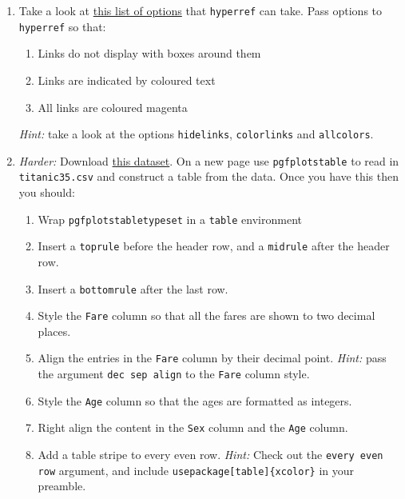 \documentclass{article}
\begin{document}
\begin{enumerate}[label=\color{purple}\theenumi.]
  \item Take a look at
    \href{http://mirror.ox.ac.uk/sites/ctan.org/macros/latex/contrib/hyperref/doc/manual.pdf#page=10}
        {this list of options} that \texttt{hyperref} can take. Pass options to 
    \texttt{hyperref} so that:
    \begin{enumerate}[label=\color{purple}\roman*)]
      \item Links do not display with boxes around them
      \item Links are indicated by coloured text
      \item All links are coloured magenta
    \end{enumerate}
    \textsl{Hint:} take a look at the options \texttt{hidelinks},
    \texttt{colorlinks} and \texttt{allcolors}.

  \item \emph{Harder:} Download
    \href{https://jwalton.info/assets/teaching/latex/titanic35.csv}%
    {this dataset}. On a new page use \texttt{pgfplotstable} to read in 
    \texttt{titanic35.csv} and construct a table from the data. Once you have
    this then you should:
    \begin{enumerate}[label=\color{purple}\roman*)]
      \item Wrap \texttt{pgfplotstabletypeset} in a \texttt{table} environment
      \item Insert a \texttt{toprule} before the header row, and a
        \texttt{midrule} after the header row.
      \item Insert a \texttt{bottomrule} after the last row.
      \item Style the \texttt{Fare} column so that all the fares are shown to
        two decimal places.
      \item Align the entries in the \texttt{Fare} column by their decimal
        point. \emph{Hint:} pass the argument \texttt{dec sep align} to the 
        \texttt{Fare} column style.
      \item Style the \texttt{Age} column so that the ages are formatted as
        integers.
      \item Right align the content in the \texttt{Sex} column and the
        \texttt{Age} column.
      \item Add a table stripe to every even row. \emph{Hint:} Check out the 
        \texttt{every even row} argument, and include 
        \texttt{\tb usepackage[table]\{xcolor\}} in your preamble.
    \end{enumerate}
\end{enumerate}
\end{document}
